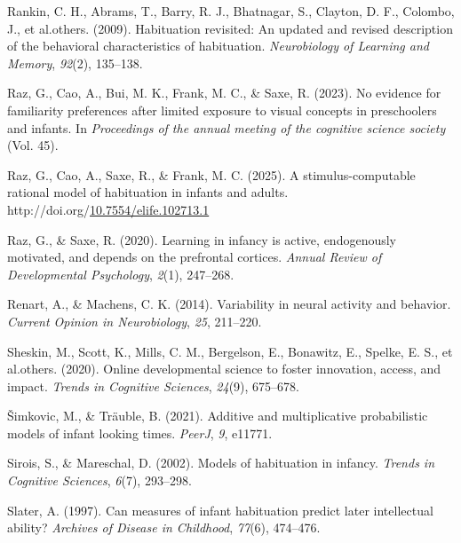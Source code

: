 \documentclass[10pt, letterpaper]{article}
\newenvironment{CSLReferences}%
  {}%
  {\par}
\begin{document}
\begin{CSLReferences}{1}{0}
\leavevmode{}%
Rankin, C. H., Abrams, T., Barry, R. J., Bhatnagar, S., Clayton, D. F.,
Colombo, J., et al.others. (2009). Habituation revisited: An updated and
revised description of the behavioral characteristics of habituation.
\emph{Neurobiology of Learning and Memory}, \emph{92}(2), 135--138.

\leavevmode{}%
Raz, G., Cao, A., Bui, M. K., Frank, M. C., \& Saxe, R. (2023). No
evidence for familiarity preferences after limited exposure to visual
concepts in preschoolers and infants. In \emph{Proceedings of the annual
meeting of the cognitive science society} (Vol. 45).

\leavevmode{}%
Raz, G., Cao, A., Saxe, R., \& Frank, M. C. (2025). A
stimulus-computable rational model of habituation in infants and adults.
http://doi.org/\href{https://doi.org/10.7554/elife.102713.1}{10.7554/elife.102713.1}

\leavevmode{}%
Raz, G., \& Saxe, R. (2020). Learning in infancy is active, endogenously
motivated, and depends on the prefrontal cortices. \emph{Annual Review
of Developmental Psychology}, \emph{2}(1), 247--268.

\leavevmode{}%
Renart, A., \& Machens, C. K. (2014). Variability in neural activity and
behavior. \emph{Current Opinion in Neurobiology}, \emph{25}, 211--220.

\leavevmode{}%
Sheskin, M., Scott, K., Mills, C. M., Bergelson, E., Bonawitz, E.,
Spelke, E. S., et al.others. (2020). Online developmental science to
foster innovation, access, and impact. \emph{Trends in Cognitive
Sciences}, \emph{24}(9), 675--678.

\leavevmode{}%
Šimkovic, M., \& Träuble, B. (2021). Additive and multiplicative
probabilistic models of infant looking times. \emph{PeerJ}, \emph{9},
e11771.

\leavevmode{}%
Sirois, S., \& Mareschal, D. (2002). Models of habituation in infancy.
\emph{Trends in Cognitive Sciences}, \emph{6}(7), 293--298.

\leavevmode{}%
Slater, A. (1997). Can measures of infant habituation predict later
intellectual ability? \emph{Archives of Disease in Childhood},
\emph{77}(6), 474--476.


\end{CSLReferences}
\end{document}

